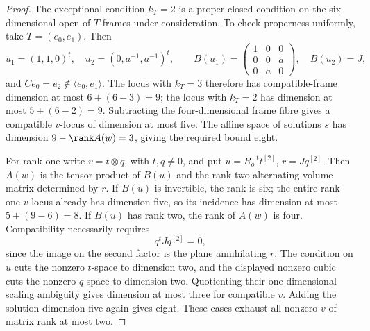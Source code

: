 \begin{proof}
The exceptional condition $k_T=2$ is a proper closed condition
on the six-dimensional open of $T$-frames under consideration.
To check properness uniformly, take $T=(e_0,e_1)$. Then
\[
 u_1=(1,1,0)^t,\quad u_2=(0,a^{-1},a^{-1})^t,\qquad
 B(u_1)=\begin{pmatrix}1&0&0\\0&0&a\\0&a&0\end{pmatrix},
 \quad B(u_2)=J,
\]
and $Ce_0=e_2\notin\langle e_0,e_1\rangle$.
The locus with $k_T=3$ therefore has compatible-frame
dimension at most $6+(6-3)=9$; the locus with $k_T=2$ has
dimension at most $5+(6-2)=9$. Subtracting the four-dimensional
frame fibre gives a compatible $v$-locus of dimension at most
five. The affine space of solutions $s$ has dimension
$9-\rank A(w)=3$, giving the required bound eight.

For rank one write $v=t\otimes q$, with $t,q\ne0$, and put
$u=R_o^{-t}t^{[2]}$, $r=Jq^{[2]}$.
Then $A(w)$ is the tensor product of $B(u)$ and the
rank-two alternating volume matrix determined by $r$.
If $B(u)$ is invertible, the rank is six; the entire rank-one
$v$-locus already has dimension five, so its incidence has
dimension at most $5+(9-6)=8$.
If $B(u)$ has rank two, the rank of $A(w)$ is four.
Compatibility necessarily requires
\[
                             q^tJq^{[2]}=0,
\]
since the image on the second factor is the plane annihilating
$r$. The condition on $u$ cuts the nonzero $t$-space to
dimension two, and the displayed nonzero cubic cuts the
nonzero $q$-space to dimension two. Quotienting their
one-dimensional scaling ambiguity gives dimension at most
three for compatible $v$. Adding the solution dimension five
again gives eight. These cases exhaust all nonzero $v$ of
matrix rank at most two.
\end{proof}

